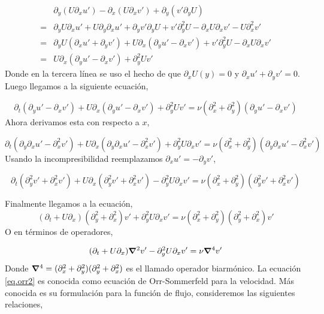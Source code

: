\documentclass[executivepaper,12pt]{article}
\numberwithin{equation}{section}
\begin{document}
\begin{align*}
	&\partial_y(U\partial_x u')-\partial_x(U\partial_x v')+\partial_y(v'\partial_y U)\\
	=&\partial_yU\partial_xu'+U\partial_y\partial_xu'+\partial_yv'\partial_yU+v'\partial_y^2U-\partial_xU\partial_xv'-U\partial_x^2v'\\
	=&\partial_yU(\partial_xu'+\partial_yv')+U\partial_x(\partial_yu'-\partial_xv')+v'\partial_y^2U-\partial_xU\partial_xv'\\
	=&U\partial_x(\partial_yu'-\partial_xv')+\partial_y^2 U v'
\end{align*}
Donde en la tercera línea se uso el hecho de que $\partial_xU(y)=0$ y $\partial_xu'+\partial_yv'=0$. Luego llegamos a la siguiente ecuación,

\begin{equation}
	\partial_t(\partial_y u' -\partial_x v') +U\partial_x(\partial_yu'-\partial_xv')+\partial_y^2 U v'=\nu(\partial_x^2 +\partial_y^2)(\partial_yu'-\partial_xv')
	\label{eq.orr1}
\end{equation}
Ahora derivamos esta con respecto a $x$,

\begin{equation*}
	\partial_t(\partial_y \partial_xu' -\partial_x^2 v') +U\partial_x(\partial_y\partial_xu'-\partial_x^2v')+\partial_y^2 U \partial_xv'=\nu(\partial_x^2 +\partial_y^2)(\partial_y\partial_xu'-\partial_x^2v')
\end{equation*}
Usando la incompresibilidad reemplazamos $\partial_xu'=-\partial_y v'$,

\begin{equation*}
	\partial_t(\partial_y^2v' +\partial_x^2 v') +U\partial_x(\partial_y^2v'+\partial_x^2v')-\partial_y^2 U \partial_xv'=\nu(\partial_x^2 +\partial_y^2)(\partial_y^2v'+\partial_x^2v')
\end{equation*}

Finalmente llegamos a la ecuación,
\begin{equation}
	(\partial_t  +U\partial_x)(\partial_y^2 +\partial_x^2) v'+\partial_y^2 U \partial_xv'=\nu(\partial_x^2 +\partial_y^2)(\partial_y^2+\partial_x^2)v'
\end{equation}
O en términos de operadores,

\begin{equation}
	(\partial_t  +U\partial_x)\gradient^2 v'-\partial_y^2 U \partial_xv'=\nu\gradient^4v'
	\label{eq.orr2}
\end{equation}
Donde $\gradient^4=(\partial_x^2 +\partial_y^2)(\partial_y^2+\partial_x^2)$ es el llamado operador biarmónico. La ecuación \ref{eq.orr2} es conocida como ecuación de Orr-Sommerfeld para la velocidad. Más conocida es su formulación para la función de flujo, consideremos las siguientes relaciones,
\end{document}
